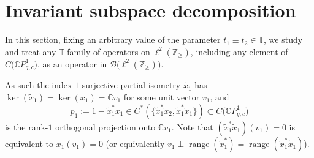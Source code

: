 \documentclass[11pt]{article}
\numberwithin{equation}{section}
\begin{document}
\section{Invariant subspace decomposition}

In this section, fixing an arbitrary value of the parameter $t_{1}%
\equiv\overline{t_{2}}\in\mathbb{T}$, we study and treat any $\mathbb{T}%
$-family of operators on $\ell^{2} ( \mathbb{Z}_{\geq} ) $,
including any element of $C\big(\mathbb{C}P_{q,c}^{1}\big) $, as an
operator in $\mathcal{B}\big( \ell^{2} ( \mathbb{Z}_{\geq} )\big) $.

As such the index-$1$ surjective partial isometry $\tilde{x}_{1}$ has
$\ker ( \tilde{x}_{1} ) =\ker ( x_{1} ) =\mathbb{C}%
v_{1}$ for some unit vector $v_{1}$, and
\[
p_{1}:=1-\tilde{x}_{1}^{\ast}\tilde{x}_{1}\in C^{\ast} ( \{
\tilde{x}_{1}^{\ast}\tilde{x}_{2},\tilde{x}_{1}^{\ast}\tilde{x}_{1} \}
 ) \subset C\big(\mathbb{C}P_{q,c}^{1}\big)
\]
is the rank-$1$ orthogonal projection onto $\mathbb{C}v_{1}$. Note that
$ ( \tilde{x}_{1}^{\ast}\tilde{x}_{1} ) ( v_{1} ) =0$
is equivalent to $\tilde{x}_{1} ( v_{1} ) =0$ (or equivalently
$v_{1}\perp\operatorname{range} ( \tilde{x}_{1}^{\ast} )
=\operatorname{range} ( \tilde{x}_{1}^{\ast}\tilde{x}_{1} ) $).
\end{document}
